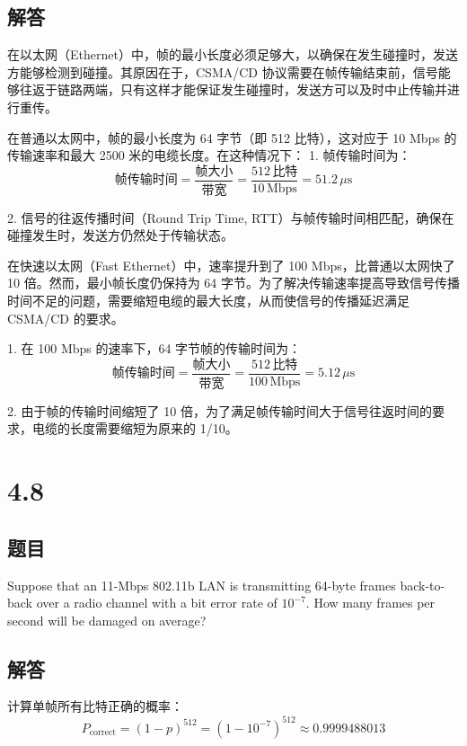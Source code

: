 \subsection*{解答}

在以太网（Ethernet）中，帧的最小长度必须足够大，以确保在发生碰撞时，发送方能够检测到碰撞。其原因在于，CSMA/CD 协议需要在帧传输结束前，信号能够往返于链路两端，只有这样才能保证发生碰撞时，发送方可以及时中止传输并进行重传。

在普通以太网中，帧的最小长度为 64 字节（即 512 比特），这对应于 10 Mbps 的传输速率和最大 2500 米的电缆长度。在这种情况下：
1. 帧传输时间为：
   \[
   \text{帧传输时间} = \frac{\text{帧大小}}{\text{带宽}} = \frac{512 \, \text{比特}}{10 \, \text{Mbps}} = 51.2 \, \mu\text{s}
   \]

2. 信号的往返传播时间（Round Trip Time, RTT）与帧传输时间相匹配，确保在碰撞发生时，发送方仍然处于传输状态。

在快速以太网（Fast Ethernet）中，速率提升到了 100 Mbps，比普通以太网快了 10 倍。然而，最小帧长度仍保持为 64 字节。为了解决传输速率提高导致信号传播时间不足的问题，需要缩短电缆的最大长度，从而使信号的传播延迟满足 CSMA/CD 的要求。

1. 在 100 Mbps 的速率下，64 字节帧的传输时间为：
   \[
   \text{帧传输时间} = \frac{\text{帧大小}}{\text{带宽}} = \frac{512 \, \text{比特}}{100 \, \text{Mbps}} = 5.12 \, \mu\text{s}
   \]

2. 由于帧的传输时间缩短了 10 倍，为了满足帧传输时间大于信号往返时间的要求，电缆的长度需要缩短为原来的 1/10。

\section{4.8}

\subsection*{题目}
Suppose that an 11-Mbps 802.11b LAN is transmitting 64-byte frames back-to-back over a radio channel with a bit error rate of \(10^{-7}\). How many frames per second will be damaged on average?

\subsection*{解答}

计算单帧所有比特正确的概率：
   \[
   P_{\text{correct}} = (1 - p)^{512} = (1 - 10^{-7})^{512} \approx 0.9999488013
   \]

